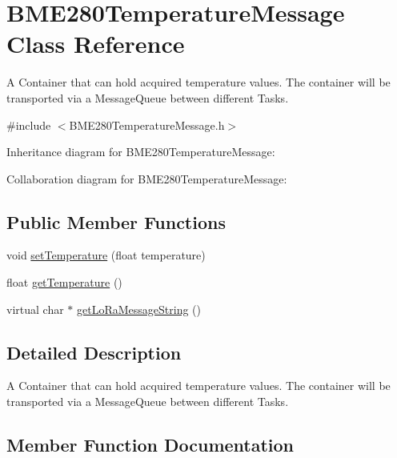 \hypertarget{class_b_m_e280_temperature_message}{}\section{B\+M\+E280\+Temperature\+Message Class Reference}
\label{class_b_m_e280_temperature_message}


A Container that can hold acquired temperature values. The container will be transported via a Message\+Queue between different Tasks.  




{\ttfamily \#include $<$B\+M\+E280\+Temperature\+Message.\+h$>$}



Inheritance diagram for B\+M\+E280\+Temperature\+Message\+:


Collaboration diagram for B\+M\+E280\+Temperature\+Message\+:
\subsection*{Public Member Functions}
\begin{DoxyCompactItemize}
\item 
void \hyperlink{class_b_m_e280_temperature_message_aff1087974dcac2689e471e9bee4333f5}{set\+Temperature} (float temperature)
\item 
float \hyperlink{class_b_m_e280_temperature_message_a8939450b60882a9824cf80584ff60ac0}{get\+Temperature} ()
\item 
virtual char $\ast$ \hyperlink{class_b_m_e280_temperature_message_a783ed2e838818dce058065b55773c3c3}{get\+Lo\+Ra\+Message\+String} ()
\end{DoxyCompactItemize}


\subsection{Detailed Description}
A Container that can hold acquired temperature values. The container will be transported via a Message\+Queue between different Tasks. 

\subsection{Member Function Documentation}
\hypertarget{class_b_m_e280_temperature_message_a783ed2e838818dce058065b55773c3c3}{}
